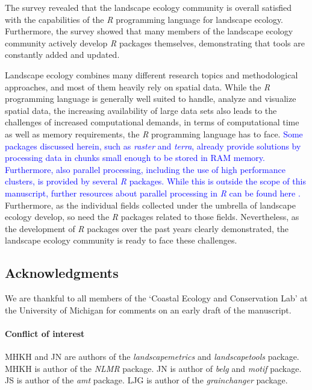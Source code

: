 \documentclass[smallextended]{svjour3}       %
\begin{document}
The survey revealed that the landscape ecology community is overall satisfied with the capabilities of the \textit{R} programming language for landscape ecology.
Furthermore, the survey showed that many members of the landscape ecology community actively develop \textit{R} packages themselves, demonstrating that tools are constantly added and updated.

Landscape ecology combines many different research topics and methodological approaches, and most of them heavily rely on spatial data.
While the \textit{R} programming language is generally well suited to handle, analyze and visualize spatial data, the increasing availability of large data sets also leads to the challenges of increased computational demands, in terms of computational time as well as memory requirements, the \textit{R} programming language has to face.
\textcolor{blue}{Some packages discussed herein, such as \textit{raster} and \textit{terra}, already provide solutions by processing data in chunks small enough to be stored in RAM memory.
Furthermore, also parallel processing, including the use of high performance clusters, is provided by several \textit{R} packages. 
While this is outside the scope of this manuscript, further resources about parallel processing in \textit{R} can be found here \cite{Bengtsson2020,Schubert2019,McCallum2012}.}
Furthermore, as the individual fields collected under the umbrella of landscape ecology develop, so need the \textit{R} packages related to those fields.
Nevertheless, as the development of \textit{R} packages over the past years clearly demonstrated, the landscape ecology community is ready to face these challenges.

\FloatBarrier

\hypertarget{acknowledgments}{%
\subsection{Acknowledgments}\label{acknowledgments}}

We are thankful to all members of the `Coastal Ecology and Conservation Lab' at the University of Michigan for comments on an early draft of the manuscript.

\hypertarget{conflict-of-interest}{%
\paragraph{Conflict of interest}\label{conflict-of-interest}}

MHKH and JN are authors of the \textit{landscapemetrics} and \textit{landscapetools} package.
MHKH is author of the \textit{NLMR} package.
JN is author of \textit{belg} and \textit{motif} package. JS is author of the \textit{amt} package. LJG is author of the \textit{grainchanger} package.
\end{document}
